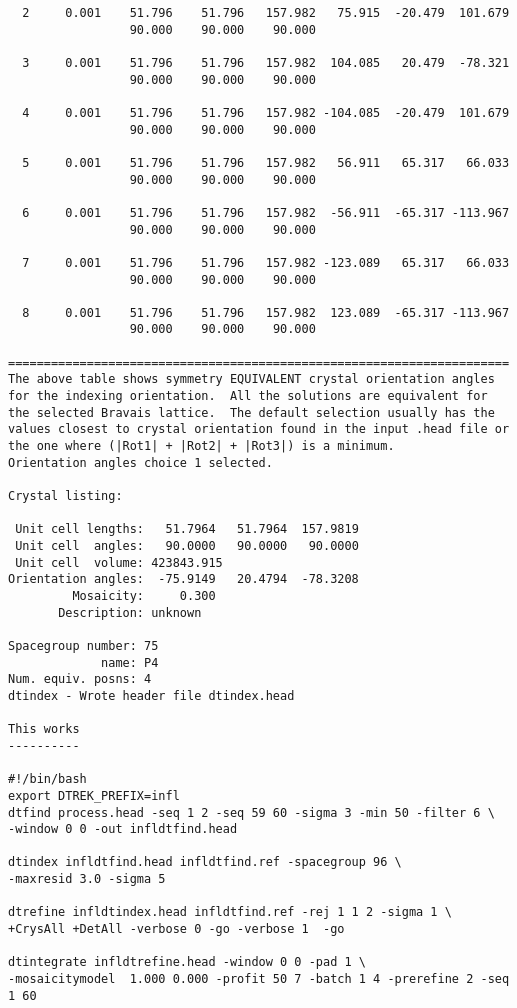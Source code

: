 \documentclass[a4paper, 11pt]{article}
\begin{document}
{\begin{verbatim}
  2     0.001    51.796    51.796   157.982   75.915  -20.479  101.679
                 90.000    90.000    90.000

  3     0.001    51.796    51.796   157.982  104.085   20.479  -78.321
                 90.000    90.000    90.000

  4     0.001    51.796    51.796   157.982 -104.085  -20.479  101.679
                 90.000    90.000    90.000

  5     0.001    51.796    51.796   157.982   56.911   65.317   66.033
                 90.000    90.000    90.000

  6     0.001    51.796    51.796   157.982  -56.911  -65.317 -113.967
                 90.000    90.000    90.000

  7     0.001    51.796    51.796   157.982 -123.089   65.317   66.033
                 90.000    90.000    90.000

  8     0.001    51.796    51.796   157.982  123.089  -65.317 -113.967
                 90.000    90.000    90.000

======================================================================
The above table shows symmetry EQUIVALENT crystal orientation angles
for the indexing orientation.  All the solutions are equivalent for
the selected Bravais lattice.  The default selection usually has the
values closest to crystal orientation found in the input .head file or
the one where (|Rot1| + |Rot2| + |Rot3|) is a minimum.
Orientation angles choice 1 selected.

Crystal listing:

 Unit cell lengths:   51.7964   51.7964  157.9819
 Unit cell  angles:   90.0000   90.0000   90.0000
 Unit cell  volume: 423843.915
Orientation angles:  -75.9149   20.4794  -78.3208
         Mosaicity:     0.300
       Description: unknown

Spacegroup number: 75
             name: P4
Num. equiv. posns: 4
dtindex - Wrote header file dtindex.head

This works
----------

#!/bin/bash
export DTREK_PREFIX=infl
dtfind process.head -seq 1 2 -seq 59 60 -sigma 3 -min 50 -filter 6 \
-window 0 0 -out infldtfind.head 

dtindex infldtfind.head infldtfind.ref -spacegroup 96 \
-maxresid 3.0 -sigma 5  

dtrefine infldtindex.head infldtfind.ref -rej 1 1 2 -sigma 1 \
+CrysAll +DetAll -verbose 0 -go -verbose 1  -go 

dtintegrate infldtrefine.head -window 0 0 -pad 1 \
-mosaicitymodel  1.000 0.000 -profit 50 7 -batch 1 4 -prerefine 2 -seq 1 60 


\end{verbatim}}
\end{document}
